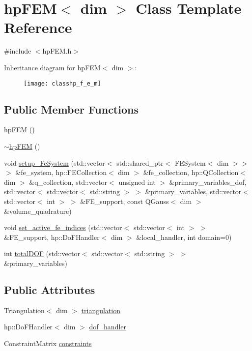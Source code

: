 \section{hp\-F\-E\-M$<$ dim $>$ Class Template Reference}
\label{classhp_f_e_m}


{\ttfamily \#include $<$hp\-F\-E\-M.\-h$>$}

Inheritance diagram for hp\-F\-E\-M$<$ dim $>$\-:\begin{figure}[H]
\begin{center}
\leavevmode
\texttt{[image: classhp\_f\_e\_m]}
\end{center}
\end{figure}
\subsection*{Public Member Functions}
\begin{DoxyCompactItemize}
\item 
\hyperlink{classhp_f_e_m_ac1540fdd371c0b89a90809251b618025}{hp\-F\-E\-M} ()
\item 
\hyperlink{classhp_f_e_m_acf426058508649734ee9618b5c9148c1}{$\sim$hp\-F\-E\-M} ()
\item 
void \hyperlink{classhp_f_e_m_afe86b756fb757221f5a8a16c956b7e76}{setup\-\_\-\-Fe\-System} (std\-::vector$<$ std\-::shared\-\_\-ptr$<$ F\-E\-System$<$ dim $>$$>$ $>$ \&fe\-\_\-system, hp\-::\-F\-E\-Collection$<$ dim $>$ \&fe\-\_\-collection, hp\-::\-Q\-Collection$<$ dim $>$ \&q\-\_\-collection, std\-::vector$<$ unsigned int $>$ \&primary\-\_\-variables\-\_\-dof, std\-::vector$<$ std\-::vector$<$ std\-::string $>$ $>$ \&primary\-\_\-variables, std\-::vector$<$ std\-::vector$<$ int $>$ $>$ \&F\-E\-\_\-support, const Q\-Gauss$<$ dim $>$ \&volume\-\_\-quadrature)
\item 
void \hyperlink{classhp_f_e_m_a12205240784051ad249a536cb7ee98d5}{set\-\_\-active\-\_\-fe\-\_\-indices} (std\-::vector$<$ std\-::vector$<$ int $>$ $>$ \&F\-E\-\_\-support, hp\-::\-Do\-F\-Handler$<$ dim $>$ \&local\-\_\-handler, int domain=0)
\item 
int \hyperlink{classhp_f_e_m_a9ceee3881af75e3be863fdb2d1688c0e}{total\-D\-O\-F} (std\-::vector$<$ std\-::vector$<$ std\-::string $>$ $>$ \&primary\-\_\-variables)
\end{DoxyCompactItemize}
\subsection*{Public Attributes}
\begin{DoxyCompactItemize}
\item 
Triangulation$<$ dim $>$ \hyperlink{classhp_f_e_m_a1e604d1e68926caf1ebc67d2a7451783}{triangulation}
\item 
hp\-::\-Do\-F\-Handler$<$ dim $>$ \hyperlink{classhp_f_e_m_ab4df20fb431f370878adc06e19280d62}{dof\-\_\-handler}
\item 
Constraint\-Matrix \hyperlink{classhp_f_e_m_aa08dcec4445eed1687b99cdb7b24b785}{constraints}
\end{DoxyCompactItemize}


